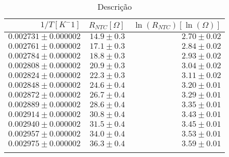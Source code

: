 
        \def\arraystretch{1.2}
        \begin{table}[H]
            \centering
            \caption{Descrição}
            \begin{tabular}{r|r|r}
            \toprule
            \midrule
$1/T [K^-1]$ & $R_{NTC} [\Omega]$ & $\ln(R_{NTC}) [\ln(\Omega)]$ \\\hline
$0.002731 \pm 0.000002$ & $14.9 \pm 0.3$ & $2.70 \pm 0.02$ \\
$0.002761 \pm 0.000002$ & $17.1 \pm 0.3$ & $2.84 \pm 0.02$ \\
$0.002784 \pm 0.000002$ & $18.8 \pm 0.3$ & $2.93 \pm 0.02$ \\
$0.002808 \pm 0.000002$ & $20.9 \pm 0.3$ & $3.04 \pm 0.02$ \\
$0.002824 \pm 0.000002$ & $22.3 \pm 0.3$ & $3.11 \pm 0.02$ \\
$0.002848 \pm 0.000002$ & $24.6 \pm 0.4$ & $3.20 \pm 0.01$ \\
$0.002872 \pm 0.000002$ & $26.7 \pm 0.4$ & $3.29 \pm 0.01$ \\
$0.002889 \pm 0.000002$ & $28.6 \pm 0.4$ & $3.35 \pm 0.01$ \\
$0.002914 \pm 0.000002$ & $30.8 \pm 0.4$ & $3.43 \pm 0.01$ \\
$0.002940 \pm 0.000002$ & $31.5 \pm 0.4$ & $3.45 \pm 0.01$ \\
$0.002957 \pm 0.000002$ & $34.0 \pm 0.4$ & $3.53 \pm 0.01$ \\
$0.002975 \pm 0.000002$ & $36.3 \pm 0.4$ & $3.59 \pm 0.01$ \\
            \bottomrule
            \label{etiqueta}
            \end{tabular}
        \end{table}
